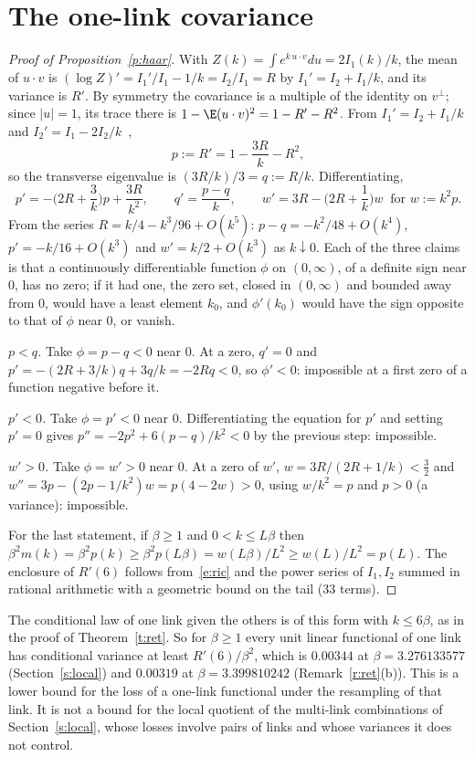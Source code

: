 \section{The one-link covariance}\label{s:haar}
\begin{proof}[Proof of Proposition~\ref{p:haar}]
With $Z(k)=\int e^{k\,u\cdot v}du=2I_1(k)/k$, the mean of $u\cdot v$ is $(\log Z)'=I_1'/I_1-1/k=I_2/I_1=R$ by
$I_1'=I_2+I_1/k$, and its variance is $R'$. By symmetry the covariance is a multiple of the identity on
$v^\perp$; since $|u|=1$, its trace there is $1-\E(u\cdot v)^2=1-R'-R^2$. From $I_1'=I_2+I_1/k$ and
$I_2'=I_1-2I_2/k$~\cite[10.29.2]{DLMF},
\begin{equation}\label{e:ric}
p:=R'=1-\frac{3R}{k}-R^2,
\end{equation}
so the transverse eigenvalue is $(3R/k)/3=q:=R/k$. Differentiating,
\[
p'=-\Big(2R+\frac3k\Big)p+\frac{3R}{k^2},\qquad q'=\frac{p-q}{k},\qquad
w'=3R-\Big(2R+\frac1k\Big)w\ \text{ for }w:=k^2p .
\]
From the series $R=k/4-k^3/96+O(k^5)$: $p-q=-k^2/48+O(k^4)$, $p'=-k/16+O(k^3)$ and $w'=k/2+O(k^3)$ as
$k\downarrow0$. Each of the three claims is that a continuously differentiable function $\phi$ on $(0,\infty)$,
of a definite sign near $0$, has no zero; if it had one, the zero set, closed in $(0,\infty)$ and bounded away
from $0$, would have a least element $k_0$, and $\phi'(k_0)$ would have the sign opposite to that of $\phi$
near $0$, or vanish.

\emph{$p<q$.} Take $\phi=p-q<0$ near $0$. At a zero, $q'=0$ and $p'=-(2R+3/k)q+3q/k=-2Rq<0$, so $\phi'<0$:
impossible at a first zero of a function negative before it.

\emph{$p'<0$.} Take $\phi=p'<0$ near $0$. Differentiating the equation for $p'$ and setting $p'=0$ gives
$p''=-2p^2+6(p-q)/k^2<0$ by the previous step: impossible.

\emph{$w'>0$.} Take $\phi=w'>0$ near $0$. At a zero of $w'$, $w=3R/(2R+1/k)<\tfrac32$ and
$w''=3p-(2p-1/k^2)w=p(4-2w)>0$, using $w/k^2=p$ and $p>0$ (a variance): impossible.

For the last statement, if $\beta\ge1$ and $0<k\le L\beta$ then
$\beta^2m(k)=\beta^2p(k)\ge\beta^2p(L\beta)=w(L\beta)/L^2\ge w(L)/L^2=p(L)$. The enclosure of $R'(6)$ follows
from~\eqref{e:ric} and the power series of $I_1,I_2$ summed in rational arithmetic with a geometric bound on
the tail (33 terms).
\end{proof}

\begin{remark}\label{r:haar}
The conditional law of one link given the others is of this form with $k\le6\beta$, as in the proof of
Theorem~\ref{t:ret}. So for $\beta\ge1$ every unit linear functional of one link has conditional variance at
least $R'(6)/\beta^2$, which is $0.00344$ at $\beta=3.276133577$ (Section~\ref{s:local}) and $0.00319$ at
$\beta=3.399810242$ (Remark~\ref{r:ret}(b)). This is
a lower bound for the loss of a one-link functional under the resampling of that link. It is not a bound for
the local quotient of the multi-link combinations of Section~\ref{s:local}, whose losses involve pairs of
links and whose variances it does not control.
\end{remark}

